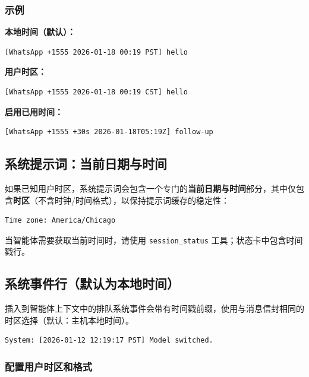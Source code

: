 \subsubsection{示例}


\textbf{本地时间（默认）：}

\begin{lstlisting}
[WhatsApp +1555 2026-01-18 00:19 PST] hello
\end{lstlisting}


\textbf{用户时区：}

\begin{lstlisting}
[WhatsApp +1555 2026-01-18 00:19 CST] hello
\end{lstlisting}


\textbf{启用已用时间：}

\begin{lstlisting}
[WhatsApp +1555 +30s 2026-01-18T05:19Z] follow-up
\end{lstlisting}


\subsection{系统提示词：当前日期与时间}


如果已知用户时区，系统提示词会包含一个专门的\textbf{当前日期与时间}部分，其中仅包含\textbf{时区}（不含时钟/时间格式），以保持提示词缓存的稳定性：

\begin{lstlisting}
Time zone: America/Chicago
\end{lstlisting}


当智能体需要获取当前时间时，请使用 \texttt{session\_status} 工具；状态卡中包含时间戳行。

\subsection{系统事件行（默认为本地时间）}


插入到智能体上下文中的排队系统事件会带有时间戳前缀，使用与消息信封相同的时区选择（默认：主机本地时间）。

\begin{lstlisting}
System: [2026-01-12 12:19:17 PST] Model switched.
\end{lstlisting}


\subsubsection{配置用户时区和格式}


